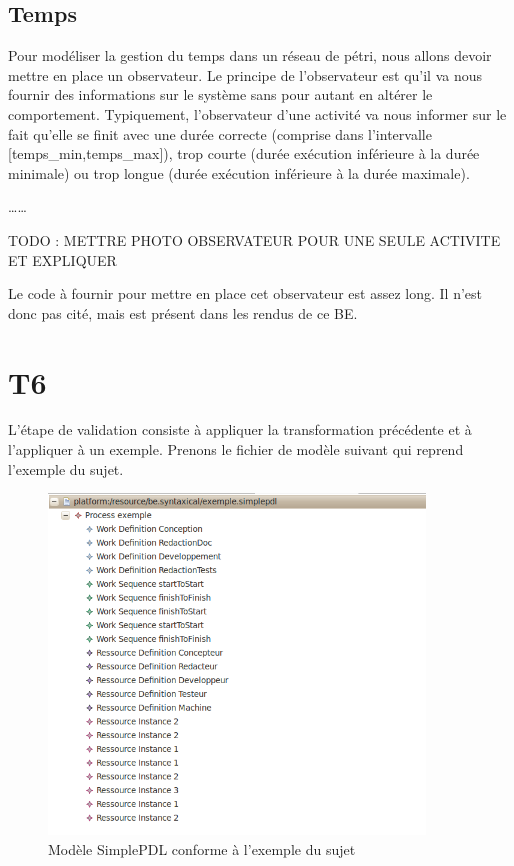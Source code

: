 \documentclass{report}
\begin{document}
\subsection{Temps}

Pour modéliser la gestion du temps dans un réseau de pétri, nous allons devoir mettre en place un observateur. Le principe de l'observateur est qu'il va nous fournir des informations sur le système sans pour autant en altérer le comportement. Typiquement, l'observateur d'une activité va nous informer sur le fait qu'elle se finit avec une durée correcte (comprise dans l'intervalle [temps\_min,temps\_max]), trop courte (durée exécution inférieure à la durée minimale) ou trop longue (durée exécution inférieure à la durée maximale).

\ldots \ldots 

TODO : METTRE PHOTO OBSERVATEUR POUR UNE SEULE ACTIVITE ET EXPLIQUER

Le code à fournir pour mettre en place cet observateur est assez long. Il n'est donc pas cité, mais est présent dans les rendus de ce BE.

\newpage

\section{T6}

L'étape de validation consiste à appliquer la transformation précédente et à l'appliquer à un exemple. Prenons le fichier de modèle suivant qui reprend l'exemple du sujet.

\begin{figure}[!h] 
\begin{center}
\includegraphics[width=10cm]{Capture-7.png}
\caption{Modèle SimplePDL conforme à l'exemple du sujet} 
\label{img1} 
\end{center}
\end{figure} 
\end{document}
